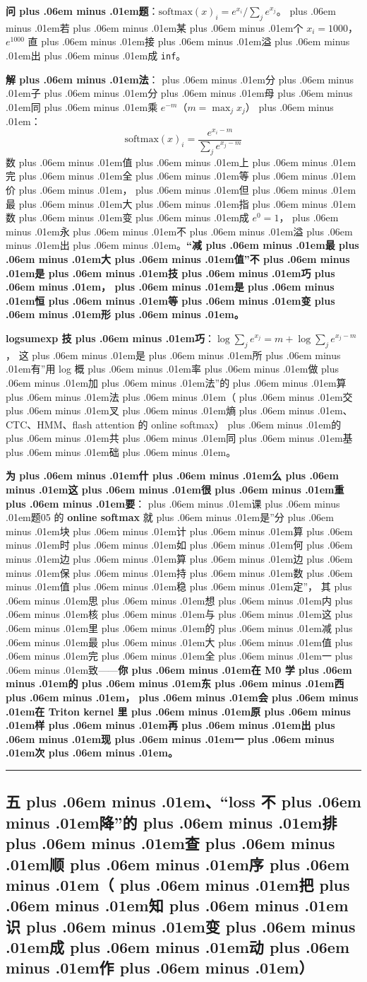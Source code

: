 \documentclass[
]{article}
\newcommand{\passthrough}[1]{#1}
\def\zh#1{{\zhfont #1}}
\def\zhglue{\hskip0pt plus .06em minus .01em}
\begin{document}
\textbf{\zh{问\zhglue 题}}\zh{：}\(\mathrm{softmax}(x)_i = e^{x_i}/\sum_j e^{x_j}\)\zh{。\zhglue 若\zhglue 某\zhglue 个} \(x_i = 1000\)\zh{，}\(e^{1000}\) \zh{直\zhglue 接\zhglue 溢\zhglue 出\zhglue 成} \passthrough{\lstinline!inf!}\zh{。}

\textbf{\zh{解\zhglue 法}}\zh{：\zhglue 分\zhglue 子\zhglue 分\zhglue 母\zhglue 同\zhglue 乘} \(e^{-m}\)\zh{（}\(m=\max_j x_j\)\zh{）\zhglue ：} \[\mathrm{softmax}(x)_i = \frac{e^{x_i-m}}{\sum_j e^{x_j-m}}\] \zh{数\zhglue 值\zhglue 上\zhglue 完\zhglue 全\zhglue 等\zhglue 价\zhglue ，\zhglue 但\zhglue 最\zhglue 大\zhglue 指\zhglue 数\zhglue 变\zhglue 成} \(e^0=1\)\zh{，\zhglue 永\zhglue 不\zhglue 溢\zhglue 出\zhglue 。}\textbf{``\zh{减\zhglue 最\zhglue 大\zhglue 值}''\zh{不\zhglue 是\zhglue 技\zhglue 巧\zhglue ，\zhglue 是\zhglue 恒\zhglue 等\zhglue 变\zhglue 形\zhglue 。}}

\textbf{logsumexp \zh{技\zhglue 巧}}\zh{：}\(\log\sum_j e^{x_j} = m + \log\sum_j e^{x_j - m}\)\zh{，} \zh{这\zhglue 是\zhglue 所\zhglue 有}''\zh{用} log \zh{概\zhglue 率\zhglue 做\zhglue 加\zhglue 法}''\zh{的\zhglue 算\zhglue 法\zhglue （\zhglue 交\zhglue 叉\zhglue 熵\zhglue 、}CTC\zh{、}HMM\zh{、}flash attention \zh{的} online softmax\zh{）\zhglue 的\zhglue 共\zhglue 同\zhglue 基\zhglue 础\zhglue 。}

\textbf{\zh{为\zhglue 什\zhglue 么\zhglue 这\zhglue 很\zhglue 重\zhglue 要}}\zh{：\zhglue 课\zhglue 题}05 \zh{的} \textbf{online softmax} \zh{就\zhglue 是}''\zh{分\zhglue 块\zhglue 计\zhglue 算\zhglue 时\zhglue 如\zhglue 何\zhglue 边\zhglue 算\zhglue 边\zhglue 保\zhglue 持\zhglue 数\zhglue 值\zhglue 稳\zhglue 定}''\zh{，} \zh{其\zhglue 思\zhglue 想\zhglue 内\zhglue 核\zhglue 与\zhglue 这\zhglue 里\zhglue 的\zhglue 减\zhglue 最\zhglue 大\zhglue 值\zhglue 完\zhglue 全\zhglue 一\zhglue 致}------\textbf{\zh{你\zhglue 在} M0 \zh{学\zhglue 的\zhglue 东\zhglue 西\zhglue ，\zhglue 会\zhglue 在} Triton kernel \zh{里\zhglue 原\zhglue 样\zhglue 再\zhglue 出\zhglue 现\zhglue 一\zhglue 次\zhglue 。}}

\begin{center}\rule{0.5\linewidth}{0.5pt}\end{center}

\subsection{\zh{五\zhglue 、}``loss \zh{不\zhglue 降}''\zh{的\zhglue 排\zhglue 查\zhglue 顺\zhglue 序\zhglue （\zhglue 把\zhglue 知\zhglue 识\zhglue 变\zhglue 成\zhglue 动\zhglue 作\zhglue ）}}\label{ux4e94loss-ux4e0dux964dux7684ux6392ux67e5ux987aux5e8fux628aux77e5ux8bc6ux53d8ux6210ux52a8ux4f5c}
\end{document}
